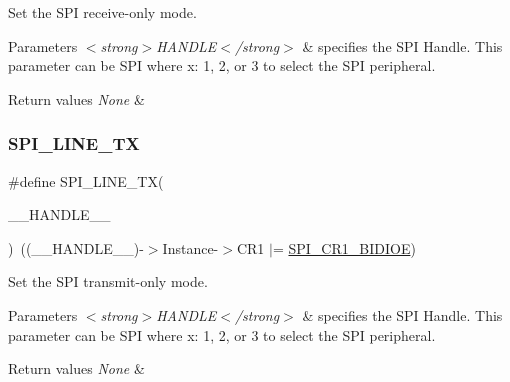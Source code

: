 Set the S\+PI receive-\/only mode. 


\begin{DoxyParams}{Parameters}
{\em $<$strong$>$\+H\+A\+N\+D\+L\+E$<$/strong$>$} & specifies the S\+PI Handle. This parameter can be S\+PI where x\+: 1, 2, or 3 to select the S\+PI peripheral. \\
\hline
\end{DoxyParams}

\begin{DoxyRetVals}{Return values}
{\em None} & \\
\hline
\end{DoxyRetVals}
\mbox{\label{group___s_p_i___private___macros_gae3b2eb5e818e58b66474d42dedac5523}} 
\subsubsection{\texorpdfstring{S\+P\+I\+\_\+L\+I\+N\+E\+\_\+\+TX}{SPI\_1LINE\_TX}}
{\footnotesize\ttfamily \#define S\+P\+I\+\_\+L\+I\+N\+E\+\_\+\+TX(\begin{DoxyParamCaption}\item[{}]{\+\_\+\+\_\+\+H\+A\+N\+D\+L\+E\+\_\+\+\_\+ }\end{DoxyParamCaption})~((\+\_\+\+\_\+\+H\+A\+N\+D\+L\+E\+\_\+\+\_\+)-\/$>$Instance-\/$>$C\+R1 $\vert$= \hyperlink{group___peripheral___registers___bits___definition_ga378953916b7701bd49f063c0366b703f}{S\+P\+I\+\_\+\+C\+R1\+\_\+\+B\+I\+D\+I\+OE})}



Set the S\+PI transmit-\/only mode. 


\begin{DoxyParams}{Parameters}
{\em $<$strong$>$\+H\+A\+N\+D\+L\+E$<$/strong$>$} & specifies the S\+PI Handle. This parameter can be S\+PI where x\+: 1, 2, or 3 to select the S\+PI peripheral. \\
\hline
\end{DoxyParams}

\begin{DoxyRetVals}{Return values}
{\em None} & \\
\hline
\end{DoxyRetVals}
\mbox{\label{group___s_p_i___private___macros_gab120a0085b72939e7d19c4f6b3381a99}} 
